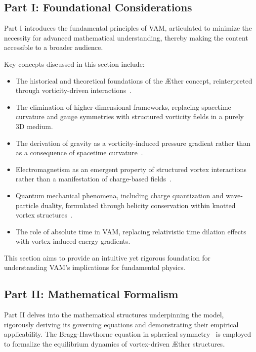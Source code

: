 \subsection*{Part I: Foundational Considerations}
Part I introduces the fundamental principles of VAM, articulated to minimize the necessity for advanced mathematical understanding, thereby making the content accessible to a broader audience.

Key concepts discussed in this section include:
\begin{itemize}
    \item The historical and theoretical foundations of the Æther concept, reinterpreted through vorticity-driven interactions~\cite{young1801, maxwell1865, michelson1887}.
    \item The elimination of higher-dimensional frameworks, replacing spacetime curvature and gauge symmetries with structured vorticity fields in a purely 3D medium.
    \item The derivation of gravity as a vorticity-induced pressure gradient rather than as a consequence of spacetime curvature~\cite{einstein_1905_4}.
    \item Electromagnetism as an emergent property of structured vortex interactions rather than a manifestation of charge-based fields~\cite{Kaluza1921, Klein1926}.
    \item Quantum mechanical phenomena, including charge quantization and wave-particle duality, formulated through helicity conservation within knotted vortex structures~\cite{kleckner2016}.
    \item The role of absolute time in VAM, replacing relativistic time dilation effects with vortex-induced energy gradients.
\end{itemize}
This section aims to provide an intuitive yet rigorous foundation for understanding VAM's implications for fundamental physics.

\subsection*{Part II: Mathematical Formalism}
Part II delves into the mathematical structures underpinning the model, rigorously deriving its governing equations and demonstrating their empirical applicability. The Bragg-Hawthorne equation in spherical symmetry~\cite{keller2024} is employed to formalize the equilibrium dynamics of vortex-driven Æther structures.

